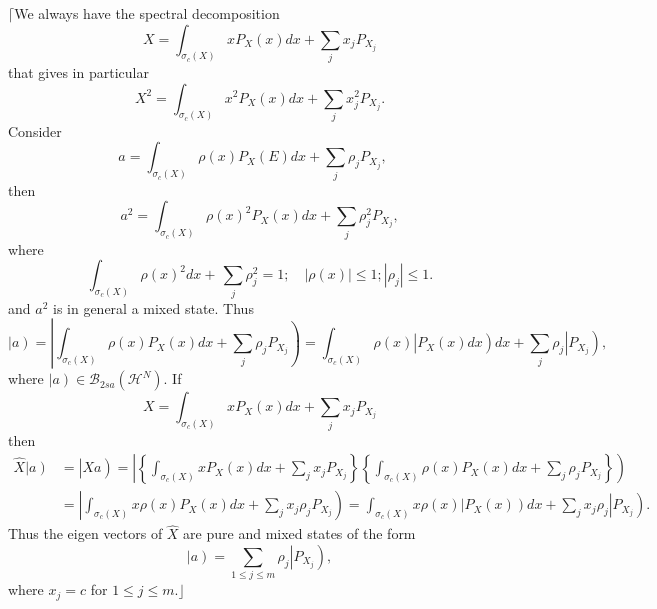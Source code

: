 \documentclass[aps,preprint]{revtex4}%
\begin{document}
$\lceil$We always have the spectral decomposition
\begin{equation}
X=\int_{\sigma_{c}\left(  X\right)  }xP_{X}\left(  x\right)  dx+\sum_{j}%
x_{j}P_{X_{j}}%
\end{equation}
that gives in particular
\begin{equation}
X^{2}=\int_{\sigma_{c}\left(  X\right)  }x^{2}P_{X}\left(  x\right)
dx+\sum_{j}x_{j}^{2}P_{X_{j}}.
\end{equation}
Consider
\begin{equation}
a=\int_{\sigma_{c}\left(  X\right)  }\rho\left(  x\right)  P_{X}\left(
E\right)  dx+\sum_{j}\rho_{j}P_{X_{j}},\quad
\end{equation}
then
\begin{equation}
a^{2}=\int_{\sigma_{c}\left(  X\right)  }\rho\left(  x\right)  ^{2}%
P_{X}\left(  x\right)  dx+\sum_{j}\rho_{j}^{2}P_{X_{j}},
\end{equation}
where%
\begin{equation}
\int_{\sigma_{c}\left(  X\right)  }\rho\left(  x\right)  ^{2}dx+\,\sum_{j}%
\rho_{j}^{2}=1;\quad\left\vert \rho\left(  x\right)  \right\vert
\leq1;\left\vert \rho_{j}\right\vert \leq1.
\end{equation}
and $a^{2}$ is in general a mixed state. Thus
\begin{equation}
\left\vert \overset{}{a}\right)  =\left\vert \int_{\sigma_{c}\left(  X\right)
}\rho\left(  x\right)  P_{X}\left(  x\right)  dx+\sum_{j}\rho_{j}P_{X_{j}%
}\right)  =\int_{\sigma_{c}\left(  X\right)  }\rho\left(  x\right)  \left\vert
\overset{}{P_{X}\left(  x\right)  dx}\right)  dx+\sum_{j}\rho_{j}\left\vert
\overset{}{P_{X_{j}}}\right)  ,
\end{equation}
where $\left\vert a\right)  \in\mathcal{B}_{2sa}\left(  \mathcal{H}%
^{N}\right)  .$ If
\begin{equation}
X=\int_{\sigma_{c}\left(  X\right)  }xP_{X}\left(  x\right)  dx+\sum_{j}%
x_{j}P_{X_{j}}%
\end{equation}
then
\begin{align}
\widehat{X}\left\vert \overset{}{a}\right)   &  =\left\vert \overset{}{Xa}%
\right)  =\left\vert \left\{  \int_{\sigma_{c}\left(  X\right)  }xP_{X}\left(
x\right)  dx+\sum_{j}x_{j}P_{X_{j}}\right\}  \left\{  \int_{\sigma_{c}\left(
X\right)  }\rho\left(  x\right)  P_{X}\left(  x\right)  dx+\sum_{j}\rho
_{j}P_{X_{j}}\right\}  \right) \nonumber\\
&  =\left\vert \int_{\sigma_{c}\left(  X\right)  }x\rho\left(  x\right)
P_{X}\left(  x\right)  dx+\sum_{j}x_{j}\rho_{j}P_{X_{j}}\right)  =\int%
_{\sigma_{c}\left(  X\right)  }x\rho\left(  x\right)  \left\vert P_{X}\left(
x\right)  \right)  dx+\sum_{j}x_{j}\rho_{j}\left\vert P_{X_{j}}\right)  .
\end{align}
Thus the eigen vectors of $\widehat{X}$ are pure and mixed states of the form
\begin{equation}
\left\vert \overset{}{a}\right)  =\sum_{1\leq j\leq m}\rho_{j}\left\vert
P_{X_{j}}\right)  ,
\end{equation}
where $x_{j}=c$ for $1\leq j\leq m$.$\rfloor$
\end{document}
